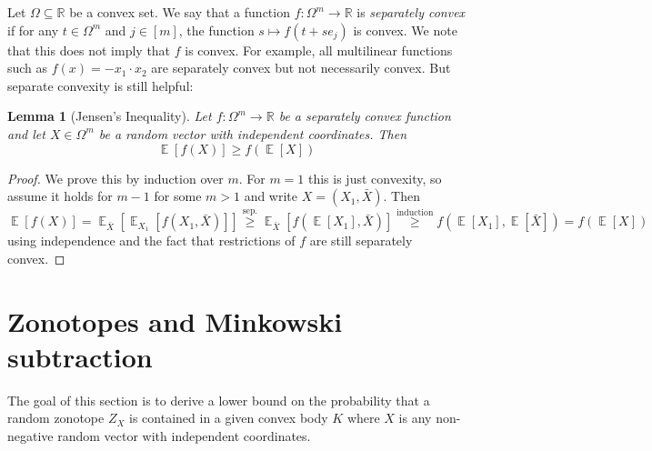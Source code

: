 \documentclass[12pt,english]{article}
\theoremstyle{theorem}
\newtheorem{lemma}[theorem]{Lemma}
\theoremstyle{remark}
\providecommand{\setR}{\mathbb{R}}
\newcommand{\E}{\mathop{\mathbb{E}}}
\begin{document}
Let $\Omega \subseteq \setR$ be a convex set. We say that a function $f : \Omega^m \to \setR$ is \emph{separately convex} if for any $t \in \Omega^m$ and $j \in [m]$, the function $s \mapsto f(t + se_j)$ is convex. We note that this does not imply that $f$ is convex. For example, all multilinear functions such as $f(x) = -x_1\cdot x_2$ are separately convex but not necessarily convex.
But separate convexity is still helpful: 
\begin{lemma}[Jensen's Inequality] \label{lem:JensenForSepConvexFcts}
  Let $f : \Omega^m \to \setR$ be a separately convex function and let $X \in \Omega^m$ be a random vector with independent coordinates. Then
  \[
    \E[f(X)] \geq f(\E[X])
  \]
\end{lemma}
\begin{proof}
  We prove this by induction over $m$. For $m = 1$ this is just convexity, so assume it holds for $m-1$ for some $m > 1$ and write $X = (X_1,\bar{X})$. Then 
  \[
   \E[f(X)] =  \E_{\bar{X}}[\E_{X_1}[f(X_1,\bar{X})]] \stackrel{\textrm{sep.}}{\geq} \E_{\bar{X}}[f(\E[X_1],\bar{X})] \stackrel{\textrm{induction}}{\geq} f(\E[X_1],\E[\bar{X}]) = f(\E[X])
  \]
  using independence and the fact that restrictions of $f$ are still separately convex.
\end{proof}

\section{Zonotopes and Minkowski subtraction}

The goal of this section is to derive a lower bound on the probability that a random zonotope $Z_{X}$ is contained in a given convex body $K$ where $X$ is any non-negative random vector with independent coordinates.
\end{document}
